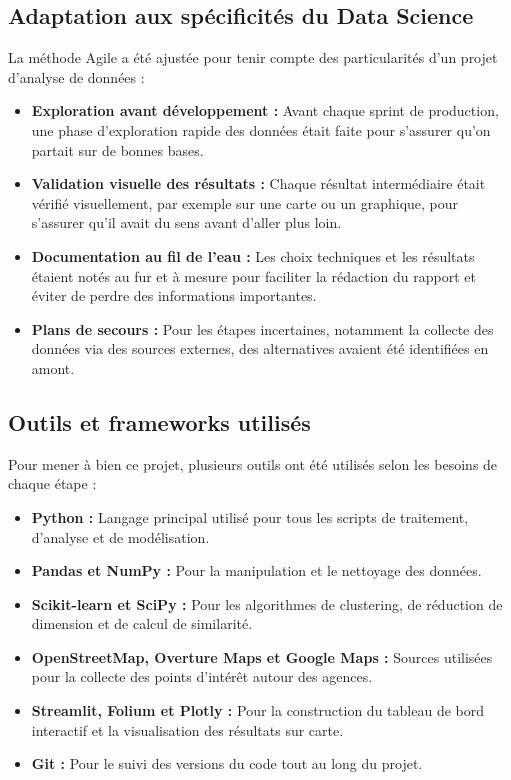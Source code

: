 \documentclass[11pt,a4paper,twoside]{report}
\begin{document}
\subsection{Adaptation aux spécificités du Data Science}

La méthode Agile a été ajustée pour tenir compte des particularités d'un projet
d'analyse de données :

\begin{itemize}[leftmargin=1.2cm]
    \item \textbf{Exploration avant développement :} Avant chaque sprint de production, une
    phase d'exploration rapide des données était faite pour s'assurer qu'on partait sur
    de bonnes bases.
    \item \textbf{Validation visuelle des résultats :} Chaque résultat intermédiaire était
    vérifié visuellement, par exemple sur une carte ou un graphique, pour s'assurer
    qu'il avait du sens avant d'aller plus loin.
    \item \textbf{Documentation au fil de l'eau :} Les choix techniques et les résultats
    étaient notés au fur et à mesure pour faciliter la rédaction du rapport et éviter
    de perdre des informations importantes.
    \item \textbf{Plans de secours :} Pour les étapes incertaines, notamment la collecte
    des données via des sources externes, des alternatives avaient été identifiées en amont.
\end{itemize}

\subsection{Outils et frameworks utilisés}

Pour mener à bien ce projet, plusieurs outils ont été utilisés selon les besoins
de chaque étape :

\begin{itemize}[leftmargin=1.2cm]
    \item \textbf{Python :} Langage principal utilisé pour tous les scripts de traitement,
    d'analyse et de modélisation.
    \item \textbf{Pandas et NumPy :} Pour la manipulation et le nettoyage des données.
    \item \textbf{Scikit-learn et SciPy :} Pour les algorithmes de clustering, de réduction
    de dimension et de calcul de similarité.
    \item \textbf{OpenStreetMap, Overture Maps et Google Maps :} Sources utilisées pour
    la collecte des points d'intérêt autour des agences.
    \item \textbf{Streamlit, Folium et Plotly :} Pour la construction du tableau de bord
    interactif et la visualisation des résultats sur carte.
    \item \textbf{Git :} Pour le suivi des versions du code tout au long du projet.
\end{itemize}
\end{document}
